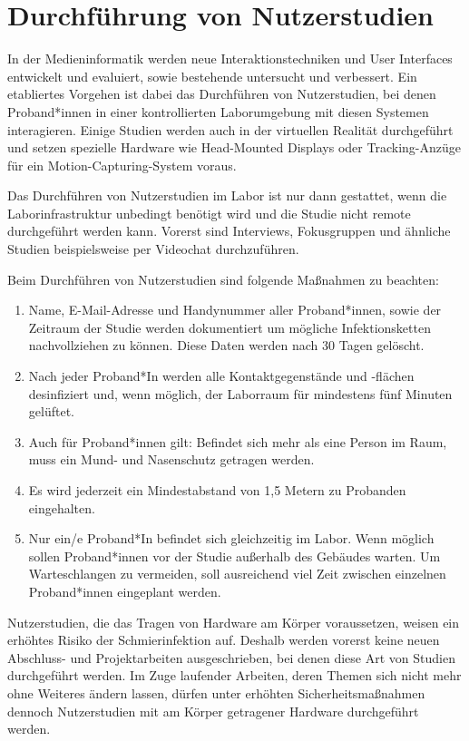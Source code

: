 \section{Durchführung von Nutzerstudien}\label{sec:nutzerstudien}

\noindent
In der Medieninformatik werden neue Interaktionstechniken und User Interfaces entwickelt und evaluiert, sowie bestehende untersucht und verbessert.
Ein etabliertes Vorgehen ist dabei das Durchführen von Nutzerstudien, bei denen Proband*innen in einer kontrollierten Laborumgebung mit diesen Systemen interagieren.
Einige Studien werden auch in der virtuellen Realität durchgeführt und setzen spezielle Hardware wie Head-Mounted Displays oder Tracking-Anzüge für ein Motion-Capturing-System voraus.

\medskip
\noindent
Das Durchführen von Nutzerstudien im Labor ist nur dann gestattet, wenn die Laborinfrastruktur unbedingt benötigt wird und die Studie nicht remote durchgeführt werden kann.
Vorerst sind Interviews, Fokusgruppen und ähnliche Studien beispielsweise per Videochat durchzuführen.

\noindent
Beim Durchführen von Nutzerstudien sind folgende Maßnahmen zu beachten:

\begin{enumerate}
    \item Name, E-Mail-Adresse und Handynummer aller Proband*innen, sowie der Zeitraum der Studie werden dokumentiert um mögliche Infektionsketten nachvollziehen zu können. Diese Daten werden nach 30 Tagen gelöscht.
    \item Nach jeder Proband*In werden alle Kontaktgegenstände und -flächen desinfiziert und, wenn möglich, der Laborraum für mindestens fünf Minuten gelüftet.
    \item Auch für Proband*innen gilt: Befindet sich mehr als eine Person im Raum, muss ein Mund- und Nasenschutz getragen werden.
    \item Es wird jederzeit ein Mindestabstand von 1,5 Metern zu Probanden eingehalten.
    \item Nur ein/e Proband*In befindet sich gleichzeitig im Labor. Wenn möglich sollen Proband*innen vor der Studie außerhalb des Gebäudes warten. Um Warteschlangen zu vermeiden, soll ausreichend viel Zeit zwischen einzelnen Proband*innen eingeplant werden.
\end{enumerate}

\noindent
Nutzerstudien, die das Tragen von Hardware am Körper voraussetzen, weisen ein erhöhtes Risiko der Schmierinfektion auf.
Deshalb werden vorerst keine neuen Abschluss- und Projektarbeiten ausgeschrieben, bei denen diese Art von Studien durchgeführt werden.
Im Zuge laufender Arbeiten, deren Themen sich nicht mehr ohne Weiteres ändern lassen, dürfen unter erhöhten Sicherheitsmaßnahmen dennoch Nutzerstudien mit am Körper getragener Hardware durchgeführt werden.

